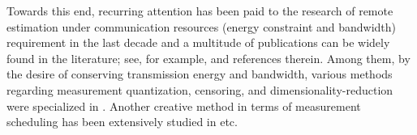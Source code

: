 \documentclass[journal]{IEEEtran}
\begin{document}
Towards this end, recurring attention has been paid to the research of remote estimation under communication resources (energy constraint and bandwidth) requirement in the last decade and a multitude of publications can be widely found in the literature; see, for example, \cite{tsp2012you, tsp2006ribeiro1,tsp2006ribeiro2,cs2010ribeiro,tsp2007schizas,tsp2008msechu,tsp2012msechu,tit2005luo,tsp2006luo,tac2012jia,tac2009savage,
spm2006luo,tsp2006ribeiro,auto2007suh,timc2011you,tsp2012shixie,auto2012battistelli,tac2013shi,auto2011shi,tsp2011yang,tsp2013you,iet2013wang, ccc2012you} and references therein. Among them, by the desire of conserving transmission energy and bandwidth, various methods regarding measurement quantization, censoring, and dimensionality-reduction were specialized in \cite{tsp2006ribeiro, tsp2006ribeiro1, tsp2006ribeiro2, cs2010ribeiro, tsp2007schizas, tsp2008msechu, tsp2012msechu,
tsp2006luo, spm2006luo, timc2011you}. Another creative method in terms of measurement scheduling has been extensively studied in \cite{tsp2012you, tac2009savage, auto2007suh, tsp2012shixie, auto2012battistelli, tac2013shi, auto2011shi, tsp2011yang, tsp2013you} etc.
\end{document}
